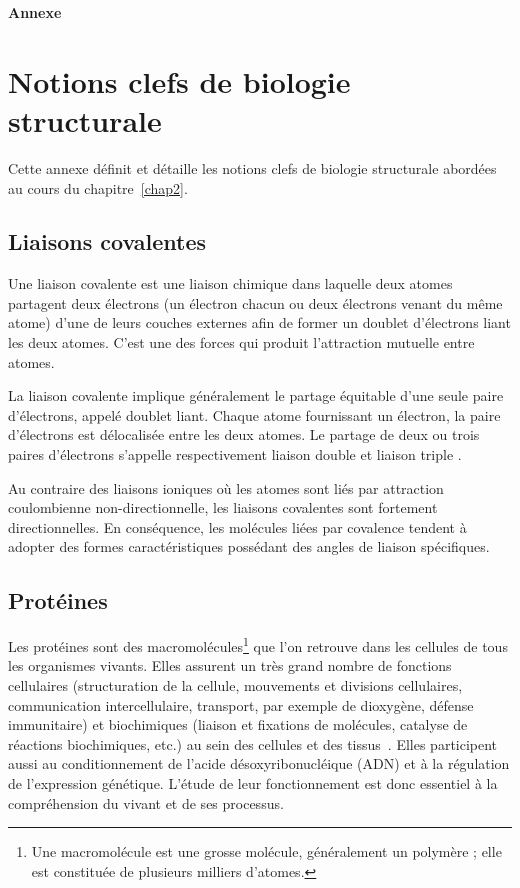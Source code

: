 
\begin{appendices}
\clearpage
\let\clearpage\relax
\vspace*{\fill}
\begin{center}
  \Huge\bfseries Annexe
\end{center}

\vspace*{\fill}
\chapter{Notions clefs de biologie structurale}
\label{appendix:annexeA}
	Cette annexe définit et détaille les notions clefs de biologie structurale abordées au cours du chapitre~\ref{chap2}.
	
	\section{Liaisons covalentes}
	Une liaison covalente est une liaison chimique dans laquelle deux atomes partagent deux électrons (un électron chacun ou deux électrons venant du même atome) d'une de leurs couches externes afin de former un doublet d'électrons liant les deux atomes. C'est une des forces qui produit l'attraction mutuelle entre atomes.
	
	La liaison covalente implique généralement le partage équitable d'une seule paire d'électrons, appelé doublet liant. Chaque atome fournissant un électron, la paire d'électrons est délocalisée entre les deux atomes. Le partage de deux ou trois paires d'électrons s'appelle respectivement \og liaison double \fg{} et \og liaison triple \fg{}.
	
	Au contraire des liaisons ioniques où les atomes sont liés par attraction coulombienne non-directionnelle, les liaisons covalentes sont fortement directionnelles. En conséquence, les molécules liées par covalence tendent à adopter des formes caractéristiques possédant des angles de liaison spécifiques.
	
	\FloatBarrier \section{Protéines}
	Les protéines sont des macromolécules\footnote{Une macromolécule est une \og grosse \fg{} molécule, généralement un polymère ; elle est constituée de plusieurs milliers d'atomes.} que l'on retrouve dans les cellules de tous les organismes vivants. Elles assurent un très grand nombre de fonctions cellulaires (structuration de la cellule, mouvements et divisions cellulaires, communication intercellulaire, transport, par exemple de dioxygène, défense immunitaire) et biochimiques (liaison et fixations de molécules, catalyse de réactions biochimiques, etc.) au sein des cellules et des tissus~\cite{lodish2004molecular}. Elles participent aussi au conditionnement de l'acide désoxyribonucléique (ADN) et à la régulation de l'expression génétique. L'étude de leur fonctionnement est donc essentiel à la compréhension du vivant et de ses processus.
	

\end{appendices}
